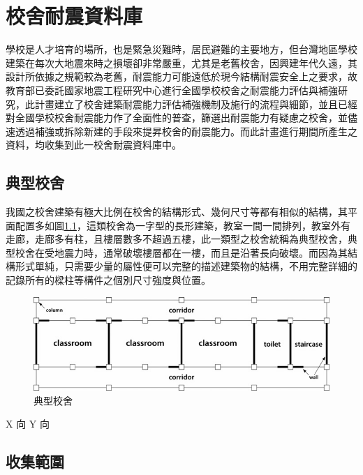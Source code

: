 \renewcommand\thetable{\arabic{chapter}-\arabic{table}}
\renewcommand{\theequation}{\arabic{chapter}-\arabic{equation}}
\chapter{校舍耐震資料庫}

學校是人才培育的場所，也是緊急災難時，居民避難的主要地方，但台灣地區學校建築在每次大地震來時之損壞卻非常嚴重，尤其是老舊校舍，因興建年代久遠，其設計所依據之規範較為老舊，耐震能力可能遠低於現今結構耐震安全上之要求，故教育部已委託國家地震工程研究中心進行全國學校校舍之耐震能力評估與補強研究，此計畫建立了校舍建築耐震能力評估補強機制及施行的流程與細節，並且已經對全國學校校舍耐震能力作了全面性的普查，篩選出耐震能力有疑慮之校舍，並儘速透過補強或拆除新建的手段來提昇校舍的耐震能力。而此計畫進行期間所產生之資料，均收集到此一校舍耐震資料庫中。

\section{典型校舍}

我國之校舍建築有極大比例在校舍的結構形式、幾何尺寸等都有相似的結構，其平面配置多如圖\ref{fig:TSB}，這類校舍為一字型的長形建築，教室一間一間排列，教室外有走廊，走廊多有柱，且樓層數多不超過五樓，此一類型之校舍統稱為典型校舍，典型校舍在受地震力時，通常破壞樓層都在一樓，而且是沿著長向破壞。而因為其結構形式單純，只需要少量的屬性便可以完整的描述建築物的結構，不用完整詳細的記錄所有的樑柱等構件之個別尺寸強度與位置。

\begin{figure}[hbtp]
  \begin{center}
    \includegraphics[width=1.0\textwidth]{figures/trad-school-buildings.png}
    \caption{典型校舍} 
    \label{fig:TSB}
  \end{center}
\end{figure}

X 向 Y 向

\section{收集範圍}

